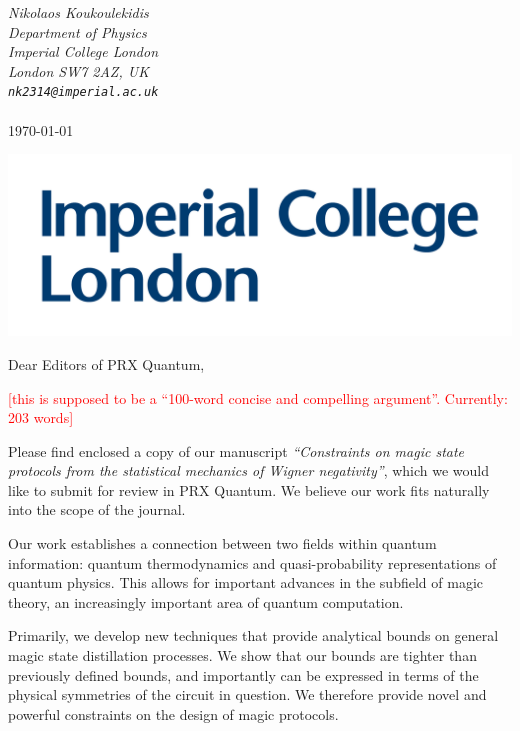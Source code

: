 \documentclass[11pt]{letter}
\newcommand{\nick}[1]{\textcolor{red}{[#1]}}
\begin{document}
\hfill\begin{minipage}{6cm}
	\raggedright
	\vspace{-2.5cm}
	{\footnotesize\itshape Nikolaos Koukoulekidis}\\
	{\footnotesize\itshape Department of Physics}\\
	{\footnotesize\itshape Imperial College London}\\
	{\footnotesize\itshape London SW7 2AZ, UK}\\
	{\footnotesize\itshape %
		\verb|nk2314@imperial.ac.uk|}\\
	~\\
		\footnotesize\today
\end{minipage}

\vspace{-3.5cm}
\includegraphics[scale=.1]{icllogo.png}
\vspace{3.5cm}

\vspace{-1.5cm}
Dear Editors of PRX Quantum,

\nick{this is supposed to be a ``100-word concise and compelling argument''. Currently: 203 words}

\vspace{.3cm}
	
Please find enclosed a copy of our manuscript \emph{``Constraints on magic state protocols from the statistical mechanics of Wigner negativity''}, which we would like to submit for review in PRX Quantum. 
We believe our work fits naturally into the scope of the journal. 

Our work establishes a connection between two fields within quantum information: quantum thermodynamics and quasi-probability representations of quantum physics.
This allows for important advances in the subfield of magic theory, an increasingly important area of quantum computation.

Primarily, we develop new techniques that provide analytical bounds on general magic state distillation processes. We show that our bounds are tighter than previously defined bounds, and importantly can be expressed in terms of the physical symmetries of the circuit in question.
We therefore provide novel and powerful constraints on the design of magic protocols.
\end{document}
